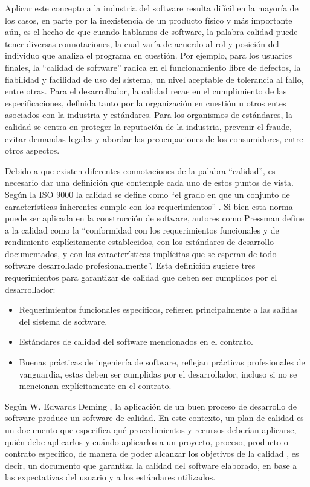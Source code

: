 \documentclass[a4paper,10pt]{article}
\begin{document}
	Aplicar este concepto a la industria del software resulta difícil en la mayoría de los casos, en parte por la inexistencia de un producto físico y más importante aún, es el hecho de que cuando hablamos de software, la palabra calidad puede tener diversas connotaciones, la cual varía de acuerdo al rol y posición del individuo que analiza el programa en cuestión. Por ejemplo, para los usuarios finales, la “calidad de software” radica en el funcionamiento libre de defectos, la fiabilidad y facilidad de uso del sistema, un nivel aceptable de tolerancia al fallo, entre otras. Para el desarrollador, la calidad recae en el cumplimiento de las especificaciones, definida tanto por la organización en cuestión u otros entes asociados con la industria y estándares. Para los organismos de estándares, la calidad se centra en proteger la reputación de la industria, prevenir el fraude, evitar demandas legales y abordar las preocupaciones de los consumidores, entre otros aspectos.
	
	Debido a que existen diferentes connotaciones de la palabra “calidad”, es necesario dar una definición que contemple cada uno de estos puntos de vista. Según la ISO 9000 la calidad se define como “el grado en que un conjunto de características inherentes cumple con los requerimientos” \parencite{ISO_9001_2015}. Si bien esta norma puede ser aplicada en la construcción de software, autores como Pressman \parencite{Pressman_2010} define a la calidad como la “conformidad con los requerimientos funcionales y de rendimiento explícitamente establecidos, con los estándares de desarrollo documentados, y con las características implícitas que se esperan de todo software desarrollado profesionalmente”. Esta definición sugiere tres requerimientos para garantizar de calidad que deben ser cumplidos por el desarrollador:
	
	\begin{itemize}
		\item Requerimientos funcionales específicos, refieren principalmente a las salidas del sistema de software.
		\item Estándares de calidad del software mencionados en el contrato.
		\item Buenas prácticas de ingeniería de software, reflejan prácticas profesionales de vanguardia, estas deben ser cumplidas por el desarrollador, incluso si no se mencionan explícitamente en el contrato.
	\end{itemize}
	
	Según W. Edwards Deming \parencite{Deming_2018}, la aplicación de un buen proceso de desarrollo de software produce un software de calidad. En este contexto, un plan de calidad es un documento que especifica qué procedimientos y recursos deberían aplicarse, quién debe aplicarlos y cuándo aplicarlos a un proyecto, proceso, producto o contrato específico, de manera de poder alcanzar los objetivos de la calidad \parencite{Álvarez_López_2005}, es decir, un documento que garantiza la calidad del software elaborado, en base a las expectativas del usuario y a los estándares utilizados.
	
\end{document}
